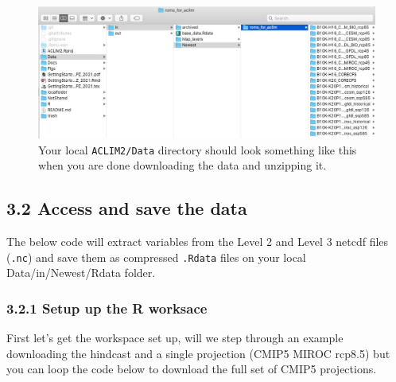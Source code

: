 \documentclass[
]{article}
\newenvironment{Shaded}{\begin{snugshade}}{\end{snugshade}}
\newcommand{\CommentTok}[1]{\textcolor[rgb]{0.56,0.35,0.01}{\textit{#1}}}
\newcommand{\DataTypeTok}[1]{\textcolor[rgb]{0.13,0.29,0.53}{#1}}
\newcommand{\KeywordTok}[1]{\textcolor[rgb]{0.13,0.29,0.53}{\textbf{#1}}}
\newcommand{\NormalTok}[1]{#1}
\newcommand{\StringTok}[1]{\textcolor[rgb]{0.31,0.60,0.02}{#1}}
\begin{document}
\begin{figure}
\centering
\includegraphics[width=1\textwidth,height=\textheight]{Figs/data_dir.jpg}
\caption{Your local \texttt{ACLIM2/Data} directory should look something
like this when you are done downloading the data and unzipping it.}
\end{figure}

\hypertarget{access-and-save-the-data}{%
\subsection{3.2 Access and save the
data}\label{access-and-save-the-data}}

The below code will extract variables from the Level 2 and Level 3
netcdf files (\texttt{.nc}) and save them as compressed \texttt{.Rdata}
files on your local Data/in/Newest/Rdata folder.

\hypertarget{setup-up-the-r-worksace}{%
\subsubsection{3.2.1 Setup up the R
worksace}\label{setup-up-the-r-worksace}}

First let's get the workspace set up, will we step through an example
downloading the hindcast and a single projection (CMIP5 MIROC rcp8.5)
but you can loop the code below to download the full set of CMIP5
projections.

\begin{Shaded}
\end{Shaded}
\end{document}
